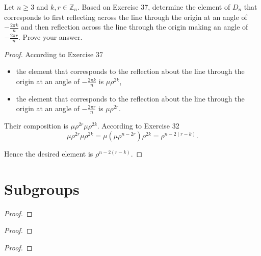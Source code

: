 \begin{exercise}
    Let $n\geq 3$ and $k, r\in\mathbb{Z}_{n}$. Based on Exercise 37, determine the element of $D_{n}$ that corresponds to first reflecting across the line through the origin at an angle of $-\frac{2\pi k}{n}$ and then reflection across the line through the origin making an angle of $-\frac{2\pi r}{n}$. Prove your answer.
\end{exercise}

\begin{proof}
    According to Exercise 37
    \begin{itemize}
        \item the element that corresponds to the reflection about the line through the origin at an angle of $-\frac{2\pi k}{n}$ is $\mu\rho^{2k}$,
        \item the element that corresponds to the reflection about the line through the origin at an angle of $-\frac{2\pi r}{n}$ is $\mu\rho^{2r}$.
    \end{itemize}

    Their composition is $\mu\rho^{2r}\mu\rho^{2k}$. According to Exercise 32
    \[
        \mu\rho^{2r}\mu\rho^{2k} = \mu(\mu\rho^{n-2r})\rho^{2k} = \rho^{n-2(r-k)}.
    \]

    Hence the desired element is $\rho^{n-2(r-k)}$.
\end{proof}

\section{Subgroups}

\begin{exercise}
\end{exercise}

\begin{proof}
\end{proof}

\begin{exercise}
\end{exercise}

\begin{proof}
\end{proof}

\begin{exercise}
\end{exercise}

\begin{proof}
\end{proof}

